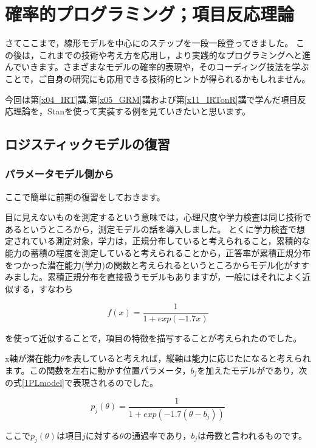 \documentclass{ltjsbook}
\begin{document}
\chapter{確率的プログラミング；項目反応理論}
\label{x27_IRTonBayes}
さてここまで，線形モデルを中心にのステップを一段一段登ってきました。
この後は，これまでの技術や考え方を応用し，より実践的なプログラミングへと進んでいきます。さまざまなモデルの確率的表現や，そのコーディング技法を学ぶことで，ご自身の研究にも応用できる技術的ヒントが得られるかもしれません。

今回は第\ref{x04_IRT}講,第\ref{x05_GRM}講および第\ref{x11_IRTonR}講で学んだ項目反応理論を，Stanを使って実装する例を見ていきたいと思います。
\section{ロジスティックモデルの復習}
\subsection{パラメータモデル側から}
ここで簡単に前期の復習をしておきます。

目に見えないものを測定するという意味では，心理尺度や学力検査は同じ技術であるというところから，測定モデルの話を導入しました。
とくに学力検査で想定されている測定対象，学力は，正規分布していると考えられること，累積的な能力の蓄積の程度を測定していると考えられることから，正答率が累積正規分布をつかった潜在能力(学力)の関数と考えられるというところからモデル化がすすみました。累積正規分布を直接扱うモデルもありますが，一般にはそれによく近似する，すなわち

\[ f(x) = \frac{1}{1+exp(-1.7x)}\]

を使って近似することで，項目の特徴を描写することが考えられたのでした。

x軸が潜在能力$\theta$を表していると考えれば，縦軸は能力に応じたになると考えられます。この関数を左右に動かす位置パラメータ，$b_j$を加えたモデルがであり，次の式\ref{1PLmodel}で表現されるのでした。

\begin{equation}
	p_j(\theta) = \frac{1}{1+exp(-1.7(\theta-b_j))}
	\label{1PLmodel}
\end{equation}

ここで$p_j(\theta)$は項目$j$に対する$\theta$の通過率であり，$b_j$は母数と言われるものです。
\end{document}
